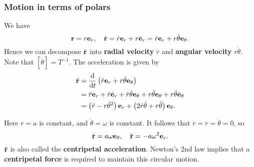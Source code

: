 \subsubsection*{Motion in terms of polars}
We have
\[
    {\bf r} = r{\bf e}_r,\quad \dot{{\bf r}} = \dot{r} {\bf e}_r + r \dot{{\bf e}}_r = \dot{r}{\bf e}_r+r\dot{\theta}{\bf e}_\theta.
\]
Hence we can decompose $ \dot{{\bf r}} $ into \textbf{radial velocity} $ \dot{r} $ and \textbf{angular velocity} $ r\dot{\theta} $. Note that $ [\dot{\theta}] = T^{-1} $. The acceleration is given by
\begin{align*}
    \ddot{{\bf r}} &= \frac{\mathrm{d}}{\mathrm{d}t}\left( \dot{r}{\bf e}_r+r\dot{\theta}{\bf e}_\theta  \right)\\
    &=  \ddot{r}{\bf e}_r+\dot{r}\dot{{\bf e}}_r+\dot{r}\dot{\theta}{\bf e}_\theta+r \ddot{\theta}{\bf e}_\theta+r \dot{\theta}\dot{{\bf e}}_\theta\\ 
    &= \left( \ddot{r}-r\dot{\theta}^2 \right){\bf e}_r+\left( 2 \dot{r}\dot{\theta}+r \ddot{\theta} \right){\bf e}_\theta.
\end{align*}
\begin{example}
    Here $ r=a $ is constant, and $ \dot{\theta} = \omega $ is constant. It follows that $ \dot{r}=\ddot{r}=\ddot{\theta}=0 $, so 
    \[
        \dot{{\bf r}} = a \omega {\bf e}_\theta,\quad \ddot{{\bf r}} = -a\omega^2{\bf e}_r.
    \]
    $ \ddot{{\bf r}} $ is also called the \textbf{centripetal acceleration}. Newton's 2nd law implies that a \textbf{centripetal force} is required to maintain this circular motion.

    \begin{center}
    \end{center}
\end{example}